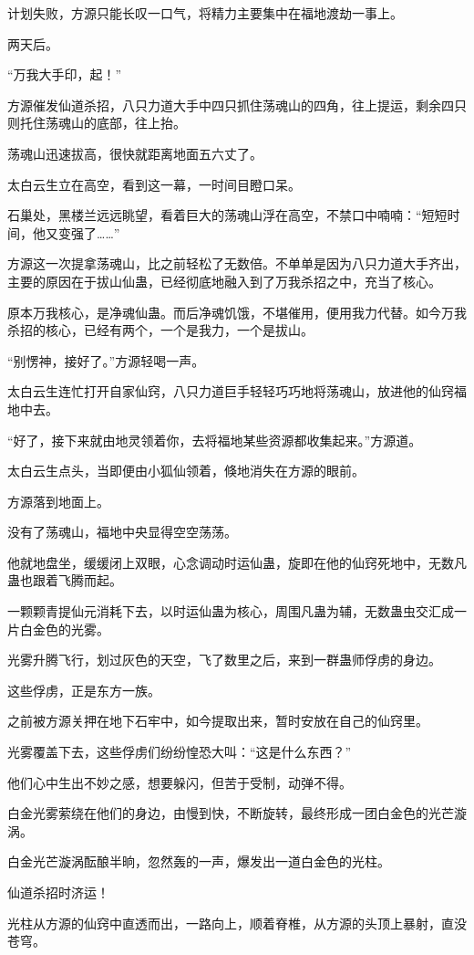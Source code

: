 \begin{this_body}
计划失败，方源只能长叹一口气，将精力主要集中在福地渡劫一事上。

两天后。

“万我大手印，起！”

方源催发仙道杀招，八只力道大手中四只抓住荡魂山的四角，往上提运，剩余四只则托住荡魂山的底部，往上抬。

荡魂山迅速拔高，很快就距离地面五六丈了。

太白云生立在高空，看到这一幕，一时间目瞪口呆。

石巢处，黑楼兰远远眺望，看着巨大的荡魂山浮在高空，不禁口中喃喃：“短短时间，他又变强了……”

方源这一次提拿荡魂山，比之前轻松了无数倍。不单单是因为八只力道大手齐出，主要的原因在于拔山仙蛊，已经彻底地融入到了万我杀招之中，充当了核心。

原本万我核心，是净魂仙蛊。而后净魂饥饿，不堪催用，便用我力代替。如今万我杀招的核心，已经有两个，一个是我力，一个是拔山。

“别愣神，接好了。”方源轻喝一声。

太白云生连忙打开自家仙窍，八只力道巨手轻轻巧巧地将荡魂山，放进他的仙窍福地中去。

“好了，接下来就由地灵领着你，去将福地某些资源都收集起来。”方源道。

太白云生点头，当即便由小狐仙领着，倏地消失在方源的眼前。

方源落到地面上。

没有了荡魂山，福地中央显得空空荡荡。

他就地盘坐，缓缓闭上双眼，心念调动时运仙蛊，旋即在他的仙窍死地中，无数凡蛊也跟着飞腾而起。

一颗颗青提仙元消耗下去，以时运仙蛊为核心，周围凡蛊为辅，无数蛊虫交汇成一片白金色的光雾。

光雾升腾飞行，划过灰色的天空，飞了数里之后，来到一群蛊师俘虏的身边。

这些俘虏，正是东方一族。

之前被方源关押在地下石牢中，如今提取出来，暂时安放在自己的仙窍里。

光雾覆盖下去，这些俘虏们纷纷惶恐大叫：“这是什么东西？”

他们心中生出不妙之感，想要躲闪，但苦于受制，动弹不得。

白金光雾萦绕在他们的身边，由慢到快，不断旋转，最终形成一团白金色的光芒漩涡。

白金光芒漩涡酝酿半晌，忽然轰的一声，爆发出一道白金色的光柱。

仙道杀招时济运！

光柱从方源的仙窍中直透而出，一路向上，顺着脊椎，从方源的头顶上暴射，直没苍穹。


\end{this_body}
